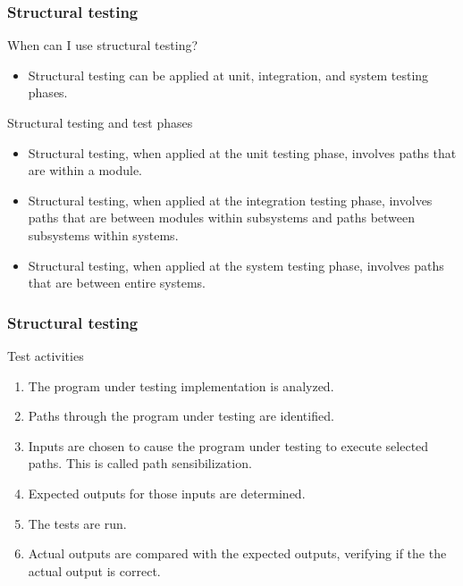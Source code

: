 \begin{frame}
\frametitle{Structural testing}

\begin{block:fact}{When can I use structural testing?}
\begin{itemize}
	\item Structural testing can be applied at unit, integration, and system
	testing phases.
\end{itemize}
\end{block:fact}


\begin{block:fact}{Structural testing and test phases}
\begin{itemize}
	\item Structural testing, when applied at the unit testing phase,
	involves paths that are within a module.

	\item Structural testing, when applied at the integration testing phase,
	involves paths that are between modules within subsystems and paths
	between subsystems within systems.

	\item Structural testing, when applied at the system testing phase,
	involves paths that are between entire systems.
\end{itemize}
\end{block:fact}
\end{frame}


\begin{frame}
\frametitle{Structural testing}

\begin{block:procedure}{Test activities}
\begin{enumerate}
	\item The program under testing implementation is analyzed.
	\item Paths through the program under testing are identified.
	\item Inputs are chosen to cause the program under testing to execute
	selected paths. This is called path sensibilization.
	\item Expected outputs for those inputs are determined.
	\item The tests are run.
	\item Actual outputs are compared with the expected outputs, verifying if
	the the actual output is correct.
\end{enumerate}
\end{block:procedure}
\end{frame}
